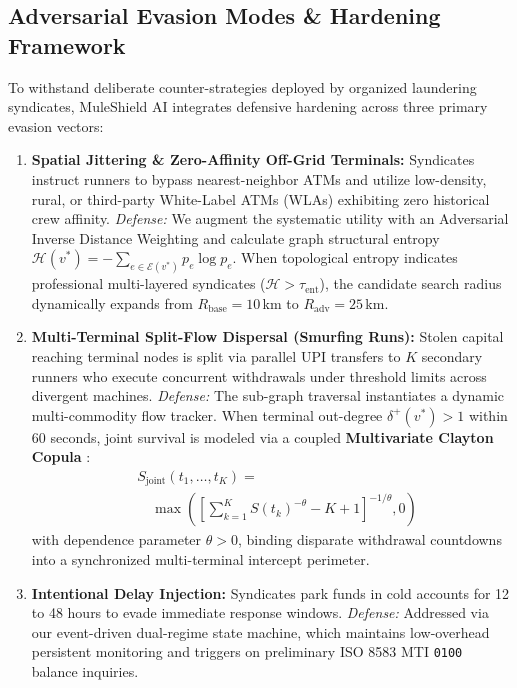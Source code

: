 \documentclass[conference]{IEEEtran}
\begin{document}
\subsection{Adversarial Evasion Modes \& Hardening Framework}
To withstand deliberate counter-strategies deployed by organized laundering syndicates, MuleShield AI integrates defensive hardening across three primary evasion vectors:
\begin{enumerate}
    \item \textbf{Spatial Jittering \& Zero-Affinity Off-Grid Terminals:} Syndicates instruct runners to bypass nearest-neighbor ATMs and utilize low-density, rural, or third-party White-Label ATMs (WLAs) exhibiting zero historical crew affinity. 
    \textit{Defense:} We augment the systematic utility with an Adversarial Inverse Distance Weighting and calculate graph structural entropy $\mathcal{H}(v^*) = -\sum_{e \in \mathcal{E}(v^*)} p_e \log p_e$. When topological entropy indicates professional multi-layered syndicates ($\mathcal{H} > \tau_{\text{ent}}$), the candidate search radius dynamically expands from $R_{\text{base}} = 10$\,km to $R_{\text{adv}} = 25$\,km.
    \item \textbf{Multi-Terminal Split-Flow Dispersal (Smurfing Runs):} Stolen capital reaching terminal nodes is split via parallel UPI transfers to $K$ secondary runners who execute concurrent withdrawals under threshold limits across divergent machines.
    \textit{Defense:} The sub-graph traversal instantiates a dynamic multi-commodity flow tracker. When terminal out-degree $\delta^+(v^*) > 1$ within 60 seconds, joint survival is modeled via a coupled \textbf{Multivariate Clayton Copula} \cite{nelsen2006}:
    \begin{equation}
    \begin{split}
    &S_{\text{joint}}(t_1, \dots, t_K) = \\
    &\quad \max\left( \left[ \sum_{k=1}^K S(t_k)^{-\theta} - K + 1 \right]^{-1/\theta}, 0 \right)
    \end{split}
    \end{equation}
    with dependence parameter $\theta > 0$, binding disparate withdrawal countdowns into a synchronized multi-terminal intercept perimeter.
    \item \textbf{Intentional Delay Injection:} Syndicates park funds in cold accounts for 12 to 48 hours to evade immediate response windows.
    \textit{Defense:} Addressed via our event-driven dual-regime state machine, which maintains low-overhead persistent monitoring and triggers on preliminary ISO 8583 MTI \texttt{0100} balance inquiries.
\end{enumerate}
\end{document}
